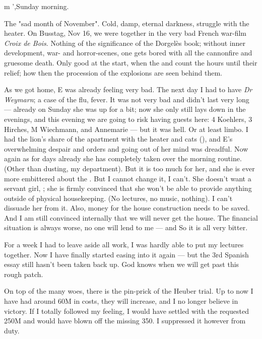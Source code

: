 m ',Sunday morning.

The "sad month of November". Cold, damp, eternal darkness, struggle with the heater. \missing On Busstag, Nov 16, we were together in the very bad French war-film \textit{Croix de Bois}. Nothing of the significance of the Dorgelès book; without inner development,  war- and horror-scenes, one gets bored with all the cannonfire and gruesome death. Only good at the start, when the  and count the hours until their relief; how then the procession of the explosions are seen behind them.

As we got home, E was already feeling very bad. The next day I had to have \textit{Dr Weymarn}; a case of the flu, fever. It was not very bad and didn't last very long — already on Sunday she was up for a bit; now she only still lays down in the evenings, and this evening  we are going to risk having guests here: 4 Koehlers, 3 Hirches, M Wiechmann, and Annemarie — but it was hell. Or at least limbo. I had the lion's share of the apartment with the heater and cats (),  and E's overwhelming despair and orders and going out of her mind was dreadful. Now again as for days already she has completely taken over the morning routine. (Other than dusting, my department). But it is too much for her, and she is ever more embittered about the . But I cannot change it, I can't. She doesn't want a servant girl, ; she is firmly convinced that she won't be able to provide anything outside of physical housekeeping. (No lectures, no music, nothing). I can't dissuade her from it.
Also, money for the house construction needs to be saved. And I am still convinced internally that we will never get the house. The financial situation is always worse, no one will lend to me — and  So it is all very bitter.

For a week I had to leave aside all work, I was hardly able to put my lectures together. Now I have finally started easing into it again — but the 3rd Spanish essay still hasn't been taken back up. God knows when we will get past this rough patch.

On top of the many woes, there is the pin-prick of the Heuber trial. Up to now I have had around 60M in costs, they will increase, and I no longer believe in victory. If I totally followed my feeling, I would have settled with the requested 250M and would have blown off the missing 350. I suppressed it however from duty.

